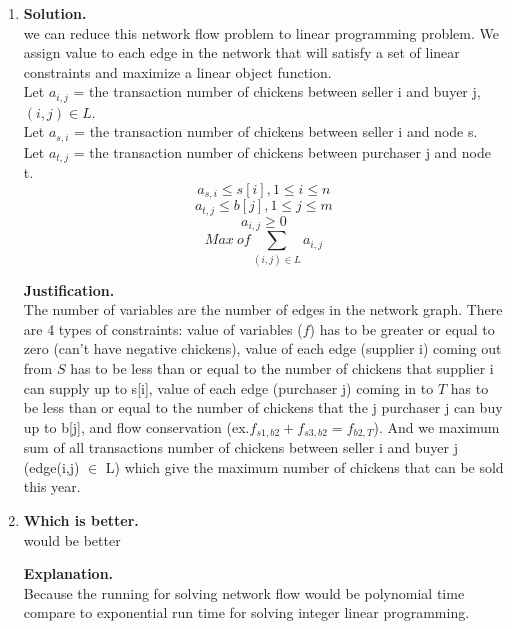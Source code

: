 \documentclass[11pt]{article}
\newenvironment{qparts}{\begin{enumerate}[{(}a{)}]}{\end{enumerate}}
\begin{document}
\begin{qparts}
\item
\textbf{Solution.}\\
we can reduce this network flow problem to linear programming problem. We assign value to each edge in the network that will satisfy a set of linear constraints and maximize a linear object function. 
\\
Let $a_{i,j}$ = the transaction number of chickens between seller i and buyer j, $(i,j) \in L $.\\
Let $a_{s,i}$ = the transaction number of chickens between seller i and node s.\\
Let $a_{t,j}$ = the transaction number of chickens between purchaser j and node t.\\
$$a_{s,i} \leq s[i], 1 \leq i \leq n$$
$$a_{t,j} \leq b[j], 1 \leq j \leq m$$
$$a_{i,j} \geq 0$$
$$Max\ of \sum_{(i,j) \in L } a_{i,j}$$

\textbf{Justification.}\\
The number of variables are the number of edges in the network graph. There are 4 types of constraints: value of variables ($f$) has to be greater or equal to zero (can't have negative chickens), value of each edge (supplier i) coming out from $S$ has to be less than or equal to the number of  chickens that supplier i can supply up to s[i], value of each edge (purchaser j) coming in to $T$ has to be less than or equal to the number of chickens that the j purchaser j can buy up to b[j], and flow conservation (ex.$f_{s1,b2} + f_{s3,b2} = f_{b2,T}$).
And we maximum sum of all transactions number of chickens between seller i and buyer j (edge(i,j) $\in$ L) which give the maximum number of chickens that can be sold this year.\\

\item
\textbf{Which is better.}\\
 would be better 

\textbf{Explanation.}\\
Because the running for solving network  flow would be polynomial time compare to exponential run time for solving integer linear programming.\\ 

\end{qparts}

\newpage
\end{document}
